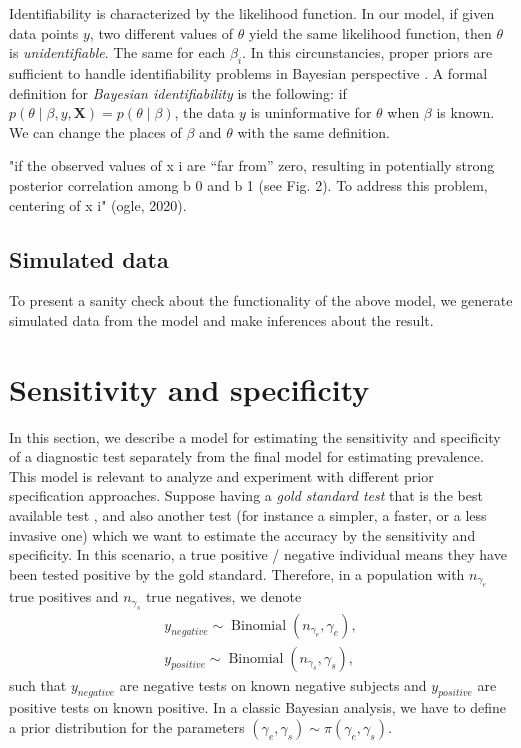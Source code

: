 Identifiability is characterized by the likelihood function. In our model, if
given data points $y$, two different values of $\theta$ yield the
same likelihood function, then $\theta$ is {\em unidentifiable}. The same for
each $\beta_i$. In this circunstancies, proper priors are sufficient to handle
identifiability problems in Bayesian perspective \cite[p.
3459]{xie2006measures}. A formal definition for {\em Bayesian identifiability}
is the following: if $p(\theta \mid \beta, y, \boldsymbol{X}) = p(\theta \mid
\beta)$, the
data $y$ is uninformative for $\theta$ when $\beta$ is known. We can change
the places of $\beta$ and $\theta$ with the same definition. 



"if the observed values of x i are “far from” zero, resulting
in potentially strong posterior correlation among b 0 and
b 1 (see Fig. 2). To address this problem, centering of x i" (ogle, 2020). 

\subsection{Simulated data}

To present a sanity check about the functionality of the above model, we
generate simulated data from the model and make inferences about the result. 

\section{Sensitivity and specificity}

In this section, we describe a model for estimating the sensitivity and
specificity of a diagnostic test separately from the final model for
estimating prevalence. This model is relevant to analyze and experiment with
different prior specification approaches. Suppose having a {\em gold standard
test} that is the best available test \cite{versi1992gold}, and also another
test (for instance a simpler, a faster, or a less invasive one) which we want
to estimate the accuracy by the sensitivity and specificity. In this scenario,
a true positive / negative individual means they have been tested positive by
the gold standard. Therefore, in a population with $n_{\gamma_e}$ true
positives and  $n_{\gamma_s}$ true negatives, we denote 
\begin{gather*}
  y_{negative} \sim \operatorname{Binomial}(n_{\gamma_e}, \gamma_e), \\
  y_{positive} \sim \operatorname{Binomial}(n_{\gamma_s}, \gamma_s),
\end{gather*}
such that $y_{negative}$ are negative tests on known negative 
subjects and $y_{positive}$ are positive tests on
known positive. In a classic Bayesian analysis, we have to define a 
prior distribution for the parameters $(\gamma_e, \gamma_s) \sim \pi(\gamma_e,
\gamma_s)$. 

